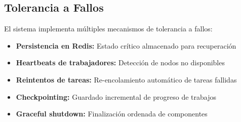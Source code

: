 \subsection{Tolerancia a Fallos}

El sistema implementa múltiples mecanismos de tolerancia a fallos:

\begin{itemize}
    \item \textbf{Persistencia en Redis:} Estado crítico almacenado para recuperación
    \item \textbf{Heartbeats de trabajadores:} Detección de nodos no disponibles
    \item \textbf{Reintentos de tareas:} Re-encolamiento automático de tareas fallidas
    \item \textbf{Checkpointing:} Guardado incremental de progreso de trabajos
    \item \textbf{Graceful shutdown:} Finalización ordenada de componentes
\end{itemize}
